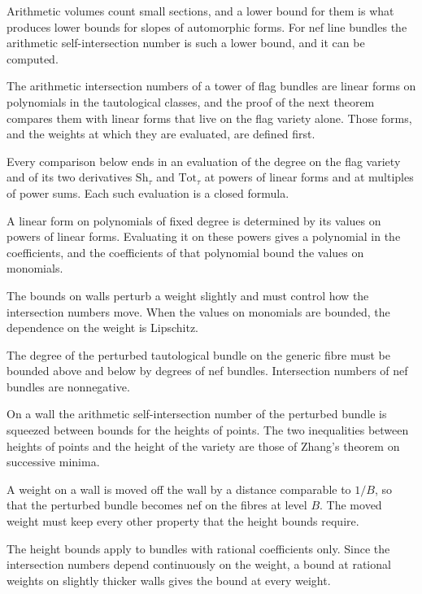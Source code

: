 Arithmetic volumes count small sections, and a lower bound for them is what produces
lower bounds for slopes of automorphic forms. For nef line bundles the arithmetic
self-intersection number is such a lower bound, and it can be computed.

The arithmetic intersection numbers of a tower of flag bundles are linear forms on polynomials in
the tautological classes, and the proof of the next theorem compares them with linear forms that
live on the flag variety alone. Those forms, and the weights at which they are evaluated, are
defined first.

Every comparison below ends in an evaluation of the degree on the flag variety and of its two
derivatives $\mathrm{Sh}_\tau$ and $\mathrm{Tot}_\tau$ at powers of linear forms and at multiples of
power sums. Each such evaluation is a closed formula.

A linear form on polynomials of fixed degree is determined by its values on powers of linear forms.
Evaluating it on these powers gives a polynomial in the coefficients, and the coefficients of that
polynomial bound the values on monomials.

The bounds on walls perturb a weight slightly and must control how the intersection numbers move.
When the values on monomials are bounded, the dependence on the weight is Lipschitz.

The degree of the perturbed tautological bundle on the generic fibre must be bounded above and below
by degrees of nef bundles. Intersection numbers of nef bundles are nonnegative.

On a wall the arithmetic self-intersection number of the perturbed bundle is squeezed between
bounds for the heights of points. The two inequalities between heights of points and the height of
the variety are those of Zhang's theorem on successive minima.

A weight on a wall is moved off the wall by a distance comparable to $1/B$, so that the perturbed
bundle becomes nef on the fibres at level $B$. The moved weight must keep every other property that
the height bounds require.

The height bounds apply to bundles with rational coefficients only. Since the intersection numbers
depend continuously on the weight, a bound at rational weights on slightly thicker walls gives the
bound at every weight.

